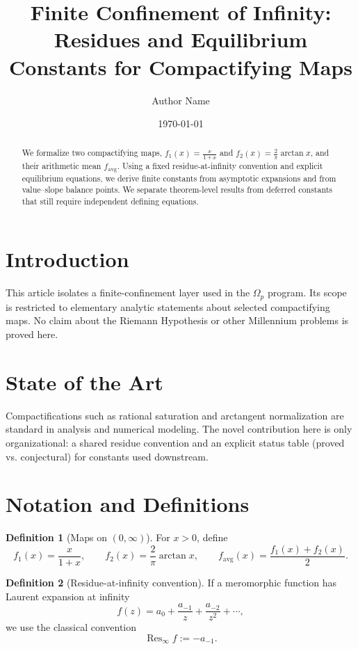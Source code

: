 \documentclass[11pt]{article}
\title{Finite Confinement of Infinity: Residues and Equilibrium Constants for Compactifying Maps}
\author{Author Name}
\date{\today}
\theoremstyle{definition}
\newtheorem{definition}{Definition}[section]
\theoremstyle{plain}
\begin{document}
\maketitle

\begin{abstract}
We formalize two compactifying maps, 
\(f_1(x)=\frac{x}{1+x}\) and \(f_2(x)=\frac{2}{\pi}\arctan x\), and their arithmetic mean 
\(f_{\mathrm{avg}}\).
Using a fixed residue-at-infinity convention and explicit equilibrium equations, we derive finite constants from asymptotic expansions and from value--slope balance points.
We separate theorem-level results from deferred constants that still require independent defining equations.
\end{abstract}

\section{Introduction}
This article isolates a finite-confinement layer used in the \(\Omega_p\) program.
Its scope is restricted to elementary analytic statements about selected compactifying maps.
No claim about the Riemann Hypothesis or other Millennium problems is proved here.

\section{State of the Art}
Compactifications such as rational saturation and arctangent normalization are standard in analysis and numerical modeling.
The novel contribution here is only organizational: a shared residue convention and an explicit status table (proved vs.
conjectural) for constants used downstream.

\section{Notation and Definitions}
\begin{definition}[Maps on \((0,\infty)\)]
\label{def:maps}
For \(x>0\), define
\[
f_1(x)=\frac{x}{1+x}, \qquad
f_2(x)=\frac{2}{\pi}\arctan x, \qquad
f_{\mathrm{avg}}(x)=\frac{f_1(x)+f_2(x)}{2}.
\]
\end{definition}

\begin{definition}[Residue-at-infinity convention]
\label{def:res-inf}
If a meromorphic function has Laurent expansion at infinity
\[
f(z)=a_0+\frac{a_{-1}}{z}+\frac{a_{-2}}{z^2}+\cdots,
\]
we use the classical convention
\[
\operatorname{Res}_{\infty} f := -a_{-1}.
\]
\end{definition}
\end{document}
